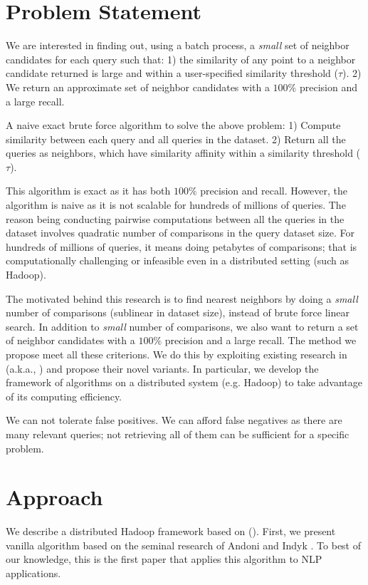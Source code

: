 
\section{Problem Statement}
We are interested in finding out, using a batch process, a \emph{small} set of
neighbor candidates for each query such that: 1) the similarity of any
point to a neighbor candidate returned is large and within a user-specified 
similarity threshold ($\tau$). 2) We return an approximate set of neighbor 
candidates with a $100\%$ precision and a large recall. 

A naive exact brute force algorithm to solve the above problem: 
1) Compute similarity between each query and all queries in the dataset. 
2) Return all the queries as neighbors, which have similarity affinity within a similarity threshold ($\tau$). 

This algorithm is exact as it has both $100\%$ precision and recall. 
However, the algorithm is naive as it is not scalable for hundreds of millions of queries. 
The reason being conducting pairwise computations between all the queries in the dataset involves 
quadratic number of comparisons in the query dataset size. 
For hundreds of millions of queries, it means doing petabytes of comparisons; 
that is  computationally challenging or infeasible even in a distributed setting (such as Hadoop).   

The motivated behind this research is to find nearest neighbors by doing a 
\emph{small} number of comparisons (sublinear in dataset size), instead of brute force linear search. 
In addition to \emph{small} number of comparisons, we also want to 
return a set of neighbor candidates with a $100\%$ precision and a large recall. 
The method we propose meet all these criterions. We do this by exploiting 
existing research in \lshf (a.k.a., \lsh) and propose their novel variants. 
In particular, we develop the framework of  \lsh algorithms on a distributed 
system (e.g. Hadoop) to take advantage of its computing efficiency.


We can not tolerate false positives. 
We can afford false negatives as there are many relevant queries; not retrieving all of them can be sufficient for a specific problem. 

\section{Approach}
\label{sec:approach}
We describe a distributed Hadoop framework based on \lshf (\lsh). 
First, we present vanilla \lsh algorithm based on the seminal research of Andoni and Indyk  . To best of our knowledge, this is the first paper that applies this algorithm to NLP applications. 

